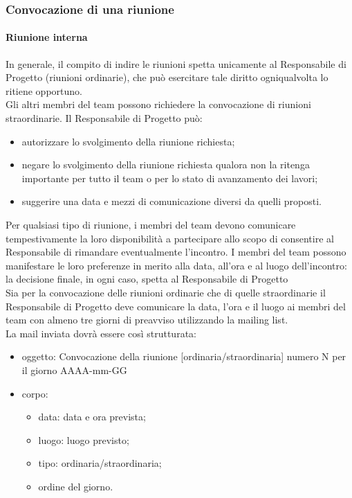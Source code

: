 		\subsubsection{Convocazione di una riunione}
			\paragraph{Riunione interna}
				In generale, il compito di indire le riunioni spetta unicamente al Responsabile di Progetto (riunioni ordinarie), che può esercitare tale diritto ogniqualvolta lo ritiene opportuno.\\
				Gli altri membri del team possono richiedere la convocazione di riunioni straordinarie. Il Responsabile di Progetto può:
				\begin{itemize}
					\item autorizzare lo svolgimento della riunione richiesta;
					\item negare lo svolgimento della riunione richiesta qualora non la ritenga importante per tutto il team o per lo stato di avanzamento dei lavori;
					\item suggerire una data e mezzi di comunicazione diversi da quelli proposti.
				\end{itemize}
				Per qualsiasi tipo di riunione, i membri del team devono comunicare tempestivamente la loro disponibilità a partecipare allo scopo di consentire al Responsabile di rimandare eventualmente l'incontro. I membri del team possono manifestare le loro preferenze in merito alla data, all'ora e al luogo dell'incontro: la decisione finale, in ogni caso, spetta al Responsabile di Progetto\\
				Sia per la convocazione delle riunioni ordinarie che di quelle straordinarie il Responsabile di Progetto deve comunicare la data, l'ora e il luogo ai membri del team con almeno tre giorni di preavviso utilizzando la mailing list.\\
				La mail inviata dovrà essere così strutturata:
				\begin{itemize}
					\item oggetto: Convocazione della riunione [ordinaria/straordinaria] numero N per il giorno AAAA-mm-GG
					\item corpo:
					\begin{itemize}
						\item data: data e ora prevista;
						\item luogo: luogo previsto;
						\item tipo: ordinaria/straordinaria;
						\item ordine del giorno.
					\end{itemize}
				\end{itemize}
